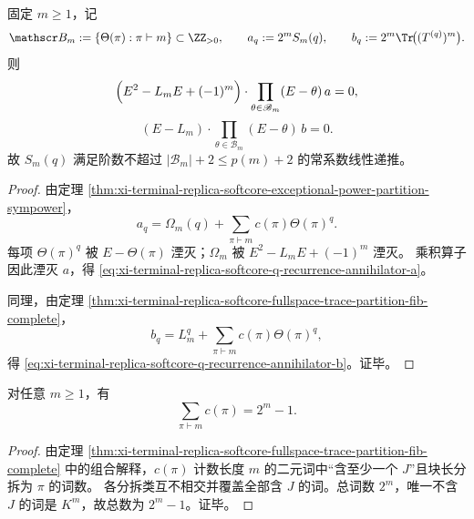 \begin{theorem}\label{thm:xi-terminal-replica-softcore-q-recurrence-partition-annihilator}
固定 \(m\ge 1\)，记
\[
\mathscr B_m:=\{\Theta(\pi):\pi\vdash m\}\subset\ZZ_{>0},\qquad
a_q:=2^m S_m(q),\qquad b_q:=2^m\Tr\!\bigl((T^{(q)})^m\bigr).
\]
则
\begin{equation}\label{eq:xi-terminal-replica-softcore-q-recurrence-annihilator-a}
\Bigl(E^2-L_mE+(-1)^m\Bigr)\cdot\prod_{\theta\in\mathscr B_m}(E-\theta)\,a=0,
\end{equation}
\begin{equation}\label{eq:xi-terminal-replica-softcore-q-recurrence-annihilator-b}
(E-L_m)\cdot\prod_{\theta\in\mathscr B_m}(E-\theta)\,b=0.
\end{equation}
故 \(S_m(q)\) 满足阶数不超过 \(|\mathscr B_m|+2\le p(m)+2\) 的常系数线性递推。
\end{theorem}
\begin{proof}
由定理 \ref{thm:xi-terminal-replica-softcore-exceptional-power-partition-sympower}，
\[
a_q=\Omega_m(q)+\sum_{\pi\vdash m}c(\pi)\Theta(\pi)^q.
\]
每项 \(\Theta(\pi)^q\) 被 \(E-\Theta(\pi)\) 湮灭；\(\Omega_m\) 被
\(
E^2-L_mE+(-1)^m
\)
湮灭。
乘积算子因此湮灭 \(a\)，得 \eqref{eq:xi-terminal-replica-softcore-q-recurrence-annihilator-a}。

同理，由定理 \ref{thm:xi-terminal-replica-softcore-fullspace-trace-partition-fib-complete}，
\[
b_q=L_m^q+\sum_{\pi\vdash m}c(\pi)\Theta(\pi)^q,
\]
得 \eqref{eq:xi-terminal-replica-softcore-q-recurrence-annihilator-b}。证毕。
\end{proof}

\begin{corollary}[分拆系数总和恒等式]\label{cor:xi-terminal-replica-softcore-partition-coeff-sum-2m-minus-1}
对任意 \(m\ge 1\)，有
\begin{equation}\label{eq:xi-terminal-replica-softcore-partition-coeff-sum}
\sum_{\pi\vdash m}c(\pi)=2^m-1.
\end{equation}
\end{corollary}
\begin{proof}
由定理 \ref{thm:xi-terminal-replica-softcore-fullspace-trace-partition-fib-complete} 中的组合解释，\(c(\pi)\) 计数长度 \(m\) 的二元词中“含至少一个 \(J\)”且块长分拆为 \(\pi\) 的词数。
各分拆类互不相交并覆盖全部含 \(J\) 的词。总词数 \(2^m\)，唯一不含 \(J\) 的词是 \(K^m\)，故总数为 \(2^m-1\)。证毕。
\end{proof}

